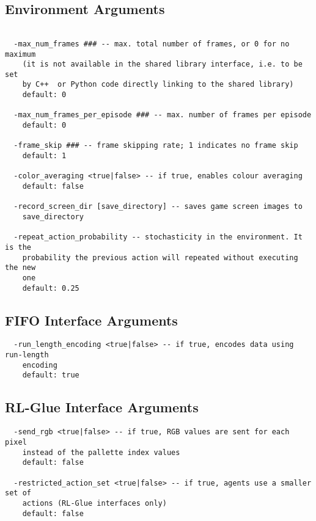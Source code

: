 \documentclass[12pt]{article}
\begin{document}
\subsection{Environment Arguments}

\small{
\begin{verbatim}

  -max_num_frames ### -- max. total number of frames, or 0 for no maximum 
    (it is not available in the shared library interface, i.e. to be set 
    by C++  or Python code directly linking to the shared library)
    default: 0

  -max_num_frames_per_episode ### -- max. number of frames per episode
    default: 0

  -frame_skip ### -- frame skipping rate; 1 indicates no frame skip 
    default: 1

  -color_averaging <true|false> -- if true, enables colour averaging 
    default: false

  -record_screen_dir [save_directory] -- saves game screen images to
    save_directory
     
  -repeat_action_probability -- stochasticity in the environment. It is the
    probability the previous action will repeated without executing the new
    one
    default: 0.25
\end{verbatim}
}

\subsection{FIFO Interface Arguments}

\small{
\begin{verbatim}
  -run_length_encoding <true|false> -- if true, encodes data using run-length
    encoding
    default: true
\end{verbatim}
}

\subsection{RL-Glue Interface Arguments}

\small{
\begin{verbatim}
  -send_rgb <true|false> -- if true, RGB values are sent for each pixel
    instead of the pallette index values
    default: false
    
  -restricted_action_set <true|false> -- if true, agents use a smaller set of 
    actions (RL-Glue interfaces only)
    default: false    
\end{verbatim}
}
\end{document}
